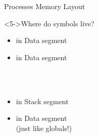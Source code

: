 \begin{Coupe}
\begin{frame}{Processes Memory Layout}
  \begin{block}<5->{Where do symbols live?}\medskip
    \begin{minipage}{.4\linewidth}
      \begin{itemize}
      \item {} in Data segment
      \item {} in Data segment\\
        ~
      \end{itemize}      
    \end{minipage}~%
    \begin{minipage}{.6\linewidth}
      \begin{itemize}
      \item {} in Stack segment
      \item {} in Data segment\\
        {\small(just like globals!)}
      \end{itemize}      
    \end{minipage}~
  \end{block}
\end{frame}

\end{Coupe}
